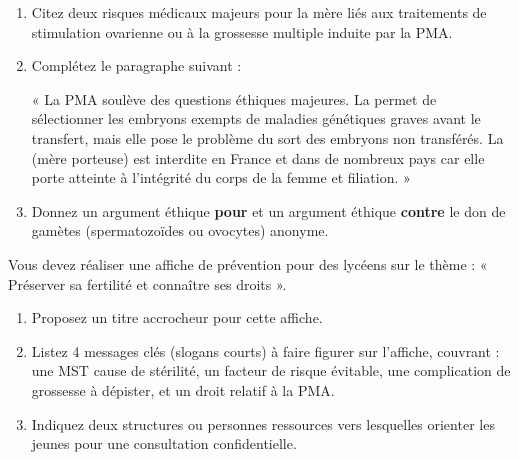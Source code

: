 \documentclass[11pt]{article}
\begin{document}
\begin{exercice}
\begin{enumerate}
    \item Citez deux risques médicaux majeurs pour la mère liés aux traitements de stimulation ovarienne ou à la grossesse multiple induite par la PMA.
    \item Complétez le paragraphe suivant :
    
    « La PMA soulève des questions éthiques majeures. La \underline{\hspace{4cm}} permet de sélectionner les embryons exempts de maladies génétiques graves avant le transfert, mais elle pose le problème du sort des embryons non transférés. La \underline{\hspace{4cm}} (mère porteuse) est interdite en France et dans de nombreux pays car elle porte atteinte à l'intégrité du corps de la femme et filiation. »
    
    \item Donnez un argument éthique \textbf{pour} et un argument éthique \textbf{contre} le don de gamètes (spermatozoïdes ou ovocytes) anonyme.
\end{enumerate}
\end{exercice}

\begin{exercice}
Vous devez réaliser une affiche de prévention pour des lycéens sur le thème : « Préserver sa fertilité et connaître ses droits ».
\begin{enumerate}
    \item Proposez un titre accrocheur pour cette affiche.
    \item Listez 4 messages clés (slogans courts) à faire figurer sur l'affiche, couvrant : une MST cause de stérilité, un facteur de risque évitable, une complication de grossesse à dépister, et un droit relatif à la PMA.
    \item Indiquez deux structures ou personnes ressources vers lesquelles orienter les jeunes pour une consultation confidentielle.
\end{enumerate}
\end{exercice}
\end{document}
